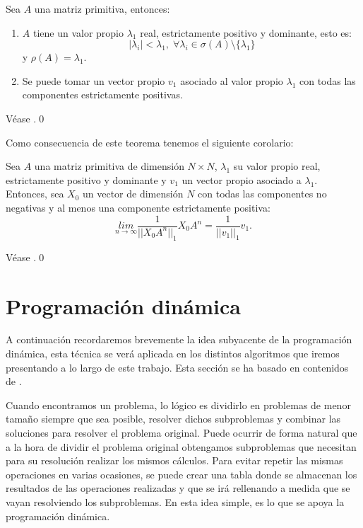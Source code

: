\begin{theorem} \label{Perron-Frobenius}
    Sea $A$ una matriz primitiva, entonces:
    \begin{enumerate}
        \item $A$ tiene un valor propio $\lambda_1$ real, estrictamente positivo y dominante, esto es:
        \[|\lambda_i|<\lambda_1,\; \forall\lambda_i\in\sigma(A)\setminus \{\lambda_1\}\]
        y $\rho(A)=\lambda_1$.
        \item Se puede tomar un vector propio $v_1$ asociado al valor propio $\lambda_1$ con todas las componentes estrictamente positivas.
    \end{enumerate}
\end{theorem}
\begin{proofs*}
    Véase \cite[Página 202]{Salinelli}.\qed
\end{proofs*}
Como consecuencia de este teorema tenemos el siguiente corolario:
\begin{corollary} \label{colorarioPerron}
    Sea $A$ una matriz primitiva de dimensión $N\times N$, $\lambda_1$ su valor propio real, estrictamente positivo y dominante y $v_1$ un vector propio asociado a $\lambda_1$. Entonces, sea $X_0$ un vector de dimensión $N$ con todas las componentes no negativas y al menos una componente estrictamente positiva:
    \[\underset{n\rightarrow\infty}{lim}\frac{1}{||X_0A^n||_1}X_0A^n=\frac{1}{||v_1||_1}v_1.\]
\end{corollary}
\begin{proofs*}
    Véase \cite[Página 201, Teorema 5.19]{Salinelli}.\qed
\end{proofs*}

\section{Programación dinámica}
A continuación recordaremos brevemente la idea subyacente de la programación dinámica, esta técnica se verá aplicada en los distintos algoritmos que iremos presentando a lo largo de este trabajo. Esta sección se ha basado en contenidos de \cite{algoritmia}.

Cuando encontramos un problema, lo lógico es dividirlo en problemas de menor tamaño siempre que sea posible, resolver dichos subproblemas y combinar las soluciones para resolver el problema original. Puede ocurrir de forma natural que a la hora de dividir el problema original obtengamos subproblemas que necesitan para su resolución realizar los mismos cálculos. Para evitar repetir las mismas operaciones en varias ocasiones, se puede crear una tabla donde se almacenan los resultados de las operaciones realizadas y que se irá rellenando a medida que se vayan resolviendo los subproblemas. En esta idea simple, es lo que se apoya la programación dinámica.

